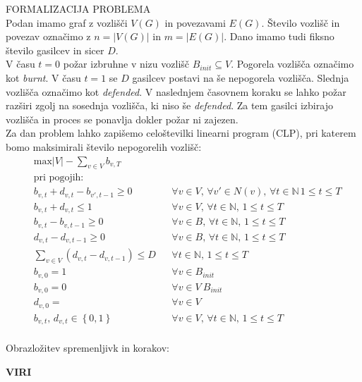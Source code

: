 \documentclass[a4paper, 11pt]{article}
\begin{document}
\noindent FORMALIZACIJA PROBLEMA \\
Podan imamo graf z vozlišči $V\left(G\right)$ in povezavami $E\left(G\right)$.
Število vozlišč in povezav označimo z $n = \left|V\left(G\right)\right|$ in $m = \left|E\left(G\right)\right|$.
Dano imamo tudi fiksno število gasilcev in sicer $D$. \\
V času $t = 0$ požar izbruhne v nizu vozlišč $B_{init} \subseteq V$. Pogorela vozlišča
označimo kot \emph{burnt}.
V času $t = 1$ se $D$ gasilcev postavi na še nepogorela vozlišča. Slednja vozlišča 
označimo kot \emph{defended}.
V naslednjem časovnem koraku se lahko požar razširi zgolj na sosednja vozlišča, ki niso še \emph{defended}.
Za tem gasilci izbirajo vozlišča in proces se ponavlja dokler požar ni zajezen. \\
Za dan problem lahko zapišemo celoštevilki linearni program (CLP), pri katerem
bomo maksimirali število nepogorelih vozlišč:
\begin{align*}
    & \text{max} \left|V\right| - \sum_{v \in V}{b_{v, T}} \\
    & \text{pri pogojih:} \\
    & b_{v,t} + d_{v,t} - b_{v',t-1} \ge 0 && \forall v \in V ,\, \forall v' \in N(v) ,\, \forall t \in \mathbb{N} \, 1 \le t \le T \\
    & b_{v,t} + d_{v,t} \le 1 && \forall v \in V ,\, \forall t \in \mathbb{N} ,\, 1 \le t \le T \\
    & b_{v,t} - b_{v,t-1} \ge 0 && \forall v \in B ,\, \forall t \in \mathbb{N} ,\, 1 \le t \le T \\
    & d_{v,t} - d_{v,t-1} \ge 0 && \forall v \in B ,\, \forall t \in \mathbb{N} ,\, 1 \le t \le T \\
    & \sum_{v \in V}{\left( d_{v,t} - d_{v, t-1} \right)} \le D && \forall t \in \mathbb{N} ,\, 1 \le t \le T \\
    & b_{v,0} = 1 && \forall v \in B_{init} \\
    & b_{v,0} = 0 && \forall v \in V \ B_{init} \\
    & d_{v,0} = && \forall v \in V \\
    & b_{v,t} ,\, d_{v,t} \in \left\{ 0, 1 \right\} && \forall v \in V ,\, \forall t \in \mathbb{N} ,\, 1 \le t \le T \\
\end{align*}

Obrazložitev spremenljivk in korakov:














\noindent \textbf{VIRI} \\




\printindex
\end{document}
